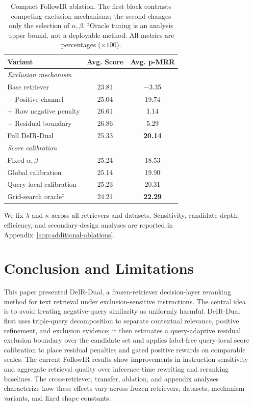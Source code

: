 \documentclass[letterpaper]{article}
\newcommand{\method}{DeIR-Dual}
\begin{document}
\begin{table}[t]
\centering
\small
\begin{tabular}{lcc}
\toprule
\textbf{Variant} & \textbf{Avg. Score} & \textbf{Avg. p-MRR} \\
\midrule
\multicolumn{3}{l}{\emph{Exclusion mechanism}} \\
Base retriever & 23.81 & $-$3.35 \\
+ Positive channel & 25.04 & 19.74 \\
+ Raw negative penalty & 26.61 & 1.14 \\
+ Residual boundary & 26.86 & 5.29 \\
Full \method{} & 25.33 & \textbf{20.14} \\
\midrule
\multicolumn{3}{l}{\emph{Score calibration}} \\
Fixed $\alpha,\beta$ & 25.24 & 18.53 \\
Global calibration & 25.14 & 19.90 \\
Query-local calibration & 25.23 & 20.31 \\
Grid-search oracle$^{\ddagger}$ & 24.21 & \textbf{22.29} \\
\bottomrule
\end{tabular}
\caption{Compact FollowIR ablation.  The first block contrasts competing
exclusion mechanisms; the second changes only the selection of
$\alpha,\beta$.  $^{\ddagger}$Oracle tuning is an analysis upper bound,
not a deployable method.  All metrics are percentages ($\times 100$).}
\label{tab:ablation-main}
\end{table}

We fix $\lambda$ and $\kappa$ across all retrievers and datasets.
Sensitivity, candidate-depth, efficiency, and secondary-design analyses
are reported in Appendix~\ref{app:additional-ablations}.

\section{Conclusion and Limitations}
\label{sec:conclusion}

This paper presented \method{}, a frozen-retriever decision-layer
reranking method for text retrieval under exclusion-sensitive
instructions.  The central idea is to avoid treating negative-query
similarity as uniformly harmful.  \method{} first uses triple-query
decomposition to separate contextual relevance, positive refinement, and
exclusion evidence; it then estimates a query-adaptive residual
exclusion boundary over the candidate set and applies label-free
query-local score calibration to place residual penalties and gated
positive rewards on comparable scales.  The current FollowIR results
show improvements in instruction sensitivity and aggregate retrieval
quality over inference-time rewriting and reranking baselines.  The
cross-retriever, transfer, ablation, and appendix analyses characterize
how these effects vary across frozen retrievers, datasets, mechanism
variants, and fixed shape constants.
\end{document}
